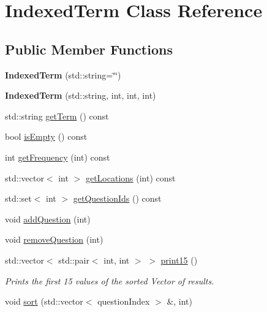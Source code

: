 \hypertarget{classIndexedTerm}{}\section{Indexed\+Term Class Reference}
\label{classIndexedTerm}
\subsection*{Public Member Functions}
\begin{DoxyCompactItemize}
\item 
\mbox{\label{classIndexedTerm_af4607f12639a14652e3ed27585d636b5}} 
{\bfseries Indexed\+Term} (std\+::string=\char`\"{}\char`\"{})
\item 
\mbox{\label{classIndexedTerm_ad3ff525566ada45119cc4d044e4733e6}} 
{\bfseries Indexed\+Term} (std\+::string, int, int, int)
\item 
std\+::string \mbox{\hyperlink{classIndexedTerm_a6e41546c9874e5382b969c41e87c3d8b}{get\+Term}} () const
\item 
bool \mbox{\hyperlink{classIndexedTerm_aeb3a182538b603b10819d6b3310f6747}{is\+Empty}} () const
\item 
int \mbox{\hyperlink{classIndexedTerm_a10df671670e9581f273a7248ca5cbe4b}{get\+Frequency}} (int) const
\item 
std\+::vector$<$ int $>$ \mbox{\hyperlink{classIndexedTerm_a195c332d821640539eadeca10514cc82}{get\+Locations}} (int) const
\item 
std\+::set$<$ int $>$ \mbox{\hyperlink{classIndexedTerm_a585907deff7738139894dd45afa11a63}{get\+Question\+Ids}} () const
\item 
void \mbox{\hyperlink{classIndexedTerm_aa55a9b814c7b084b2e33fb57aa81efaf}{add\+Question}} (int)
\item 
void \mbox{\hyperlink{classIndexedTerm_a766b250a2e276ddd3270e1eb19d1d10d}{remove\+Question}} (int)
\item 
std\+::vector$<$ std\+::pair$<$ int, int $>$ $>$ \mbox{\hyperlink{classIndexedTerm_acbffdf0e7324840c5157ff18f3de67cc}{print15}} ()
\begin{DoxyCompactList}\small\item\em Prints the first 15 values of the sorted Vector of results. \end{DoxyCompactList}\item 
void \mbox{\hyperlink{classIndexedTerm_a923c8542c47170f848610bd7132eb71d}{sort}} (std\+::vector$<$ question\+Index $>$ \&, int)

\end{DoxyCompactItemize}

